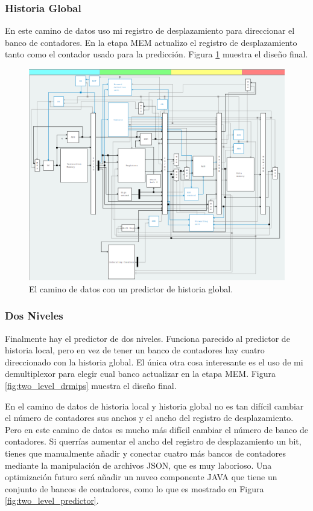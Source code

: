 \documentclass[a4paper]{article}
\begin{document}
\subsubsection{Historia Global}

En este camino de datos uso mi registro de desplazamiento para direccionar el banco de contadores. En la etapa MEM actualizo el registro de desplazamiento tanto como el contador usado para la predicción. Figura \ref{fig:global_history_drmips} muestra el diseño final.

\begin{figure}[!htb]
\centering
\includegraphics[scale=0.4]{./img/global_history_drmips}
\caption{El camino de datos con un predictor de historia global.}
\label{fig:global_history_drmips}
\end{figure}

\subsubsection{Dos Niveles}

Finalmente hay el predictor de dos niveles. Funciona parecido al predictor de historia local, pero en vez de tener un banco de contadores hay cuatro direccionado con la historia global. El única otra cosa interesante es el uso de mi demultiplexor para elegir cual banco actualizar en la etapa MEM. Figura \ref{fig:two_level_drmips} muestra el diseño final.

En el camino de datos de historia local y historia global no es tan difícil cambiar el número de contadores sus anchos y el ancho del registro de desplazamiento. Pero en este camino de datos es mucho más difícil cambiar el número de banco de contadores. Si querrías aumentar el ancho del registro de desplazamiento un bit, tienes que manualmente añadir y conectar cuatro más bancos de contadores mediante la manipulación de archivos JSON, que es muy laborioso. Una optimización futuro será añadir un nuveo componente JAVA que tiene un conjunto de bancos de contadores, como lo que es mostrado en Figura \ref{fig:two_level_predictor}.
\end{document}
